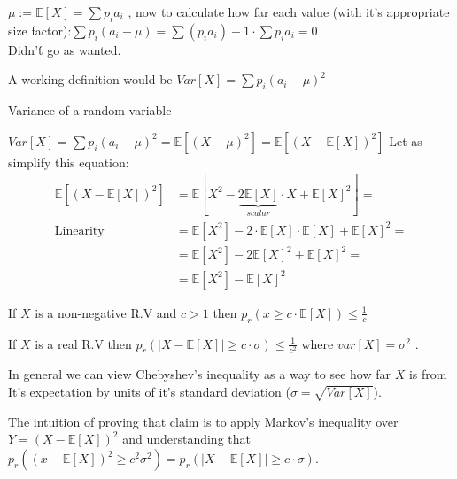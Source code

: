 $\mu:=\mathbb{E}\left[X\right]=\sum p_{i}a_{i}$ , now to calculate
how far each value (with it's appropriate size factor):$\sum p_{i}\left(a_{i}-\mu\right)=\sum\left(p_{i}a_{i}\right)-1\cdot\sum p_{i}a_{i}=0$
\\
Didn'\'{t} go as wanted.

A working definition would be $Var\left[X\right]=\sum p_{i}\left(a_{i}-\mu\right)^{2}$
\begin{definition}
Variance of a random variable

$Var\left[X\right]=\sum p_{i}\left(a_{i}-\mu\right)^{2}=\mathbb{E}\left[\left(X-\mu\right)^{2}\right]=\mathbb{E}\left[\left(X-\mathbb{E}\left[X\right]\right)^{2}\right]$
Let as simplify this equation:
\begin{align*}
\mathbb{E}\left[\left(X-\mathbb{E}\left[X\right]\right)^{2}\right] & =\mathbb{E}\left[X^{2}-\underbrace{2\mathbb{E}\left[X\right]}_{scalar}\cdot X+\mathbb{E}\left[X\right]^{2}\right]=\\
\text{Linearity} & =\mathbb{E}\left[X^{2}\right]-2\cdot\mathbb{E}\left[X\right]\cdot\mathbb{E}\left[X\right]+\mathbb{E}\left[X\right]^{2}=\\
 & =\mathbb{E}\left[X^{2}\right]-2\mathbb{E}\left[X\right]^{2}+\mathbb{E}\left[X\right]^{2}=\\
 & =\mathbb{E}\left[X^{2}\right]-\mathbb{E}\left[X\right]^{2}
\end{align*}
\end{definition}

\begin{thm}
 If $X$ is a non-negative R.V and $c>1$ then $p_{r}\left(x\ge c\cdot\mathbb{E}\left[X\right]\right)\le\frac{1}{c}$
\end{thm}

\begin{theorem}
    \label{probabilty:chebyshev}
 If $X$ is a real R.V then $p_{r}\left(\left|X-\mathbb{E}\left[X\right]\right|\ge c\cdot\sigma\right)\le\frac{1}{c^{2}}$
where $var\left[X\right]=\sigma^{2}$ .

In general we can view Chebyshev's inequality as a way to see how
far $X$ is from It's expectation by units of it's standard deviation
($\sigma=\sqrt{Var\left[X\right]}$).

The intuition of proving that claim is to apply Markov's inequality
over $Y=\left(X-\mathbb{E}\left[X\right]\right)^{2}$ and understanding
that $p_{r}\left(\left(x-\mathbb{E}\left[X\right]\right)^{2}\ge c^{2}\sigma^{2}\right)=p_{r}\left(\left|X-\mathbb{E}\left[X\right]\right|\ge c\cdot\sigma\right)$.

\end{theorem}

